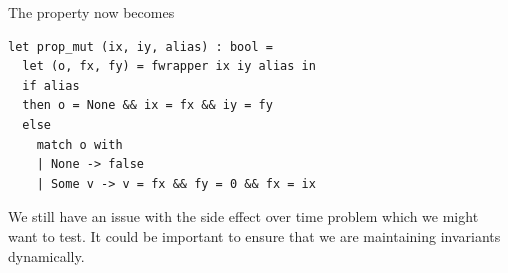 The property now becomes
\begin{lstlisting}
let prop_mut (ix, iy, alias) : bool =
  let (o, fx, fy) = fwrapper ix iy alias in
  if alias
  then o = None && ix = fx && iy = fy
  else 
    match o with
    | None -> false
    | Some v -> v = fx && fy = 0 && fx = ix
\end{lstlisting}
We still have an issue with the side effect over time problem which we might want to test. It could be important to ensure that we are maintaining invariants dynamically.
